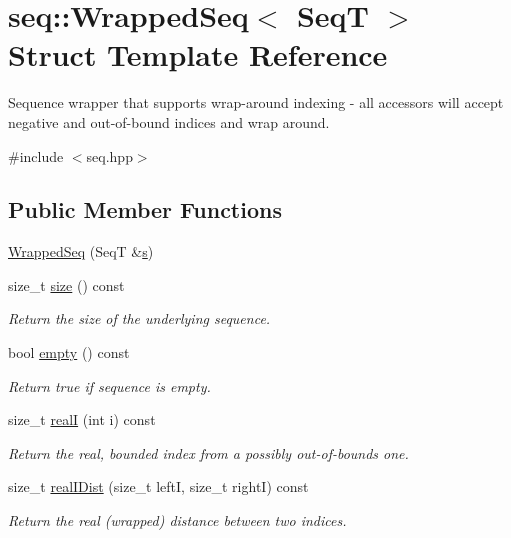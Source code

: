 \hypertarget{structseq_1_1_wrapped_seq}{\section{seq\-:\-:Wrapped\-Seq$<$ Seq\-T $>$ Struct Template Reference}
\label{structseq_1_1_wrapped_seq}
}


Sequence wrapper that supports wrap-\/around indexing -\/ all accessors will accept negative and out-\/of-\/bound indices and wrap around.  




{\ttfamily \#include $<$seq.\-hpp$>$}

\subsection*{Public Member Functions}
\begin{DoxyCompactItemize}
\item 
\hyperlink{structseq_1_1_wrapped_seq_aeb07ecb3ae54bc7460405d3f95098bcd}{Wrapped\-Seq} (Seq\-T \&\hyperlink{structseq_1_1_wrapped_seq_a838d548016ce08b745cb29dbee635437}{s})
\item 
size\-\_\-t \hyperlink{structseq_1_1_wrapped_seq_ab892f134a58400cc8a8ae32a2dabb7c4}{size} () const 
\begin{DoxyCompactList}\small\item\em Return the size of the underlying sequence. \end{DoxyCompactList}\item 
bool \hyperlink{structseq_1_1_wrapped_seq_abef397e7335e8705520777284326fe23}{empty} () const 
\begin{DoxyCompactList}\small\item\em Return {\ttfamily true} if sequence is empty. \end{DoxyCompactList}\item 
size\-\_\-t \hyperlink{structseq_1_1_wrapped_seq_a0259bb6a1a44a68e4dbda5b37750f503}{real\-I} (int i) const 
\begin{DoxyCompactList}\small\item\em Return the real, bounded index from a possibly out-\/of-\/bounds one. \end{DoxyCompactList}\item 
size\-\_\-t \hyperlink{structseq_1_1_wrapped_seq_a2b929ec2f56c92a9b2269f1853e4cd10}{real\-I\-Dist} (size\-\_\-t left\-I, size\-\_\-t right\-I) const 
\begin{DoxyCompactList}\small\item\em Return the real (wrapped) distance between two indices. \end{DoxyCompactList}\end{DoxyCompactItemize}
